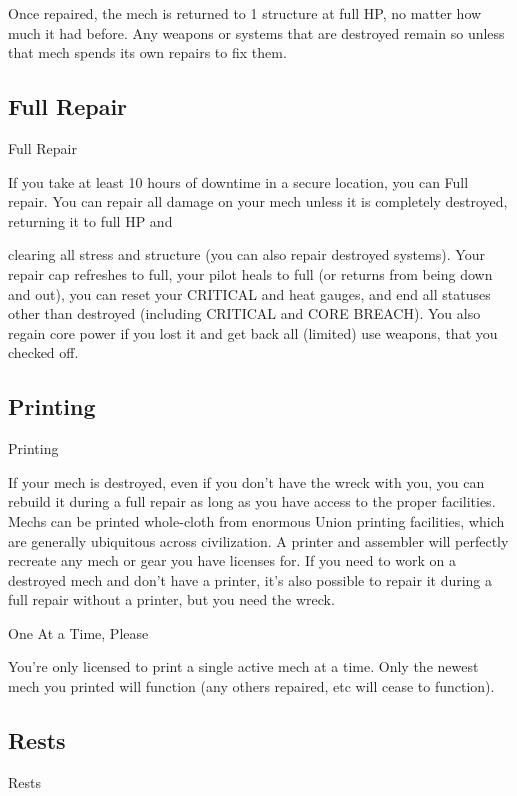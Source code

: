Once repaired, the mech is returned to 1 structure at full HP, no matter how much it had before.  
Any weapons or systems that are destroyed remain so unless that mech spends its own repairs to  
fix them.  
\subsection{Full Repair}
                                                Full Repair  

If you take at least 10 hours of downtime in a secure location, you can Full repair. You can  
repair all damage on your mech unless it is completely destroyed, returning it to full HP and  

                                                                                                                


clearing all stress and structure (you can also repair destroyed systems). Your repair cap  
refreshes to full, your pilot heals to full (or returns from being down and out), you can reset  
your CRITICAL and heat gauges, and end all statuses other than destroyed (including  
CRITICAL and CORE BREACH). You also regain core power if you lost it and get back all  
(limited) use weapons, that you checked off. 
 
\subsection{Printing}
                                                   Printing  

If your mech is destroyed, even if you don’t have the wreck with you, you can rebuild it during a  
full repair as long as you have access to the proper facilities. Mechs can be printed whole-cloth  
from enormous Union printing facilities, which are generally ubiquitous across civilization. A  
printer and assembler will perfectly recreate any mech or gear you have licenses for. If you need  
to work on a destroyed mech and don’t have a printer, it’s also possible to repair it during a full  
repair without a printer, but you need the wreck.
 

                                            One At a Time, Please  

You’re only licensed to print a single active mech at a time. Only the newest mech you printed  
will function (any others repaired, etc will cease to function).
 
\subsection{Rests}
                                                     Rests  

